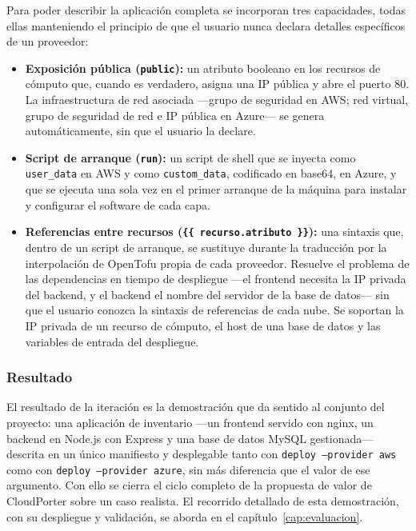 Para poder describir la aplicación completa se incorporan tres capacidades, todas ellas
manteniendo el principio de que el usuario nunca declara detalles específicos de un proveedor:

\begin{itemize}
    \item \textbf{Exposición pública (\texttt{public}):} un atributo booleano en los recursos de
    cómputo que, cuando es verdadero, asigna una IP pública y abre el puerto 80. La
    infraestructura de red asociada —grupo de seguridad en AWS; red virtual, grupo de seguridad
    de red e IP pública en Azure— se genera automáticamente, sin que el usuario la declare.
    \item \textbf{Script de arranque (\texttt{run}):} un script de shell que se inyecta como
    \texttt{user\_data} en AWS y como \texttt{custom\_data}, codificado en base64, en Azure, y
    que se ejecuta una sola vez en el primer arranque de la máquina para instalar y configurar el
    software de cada capa.
    \item \textbf{Referencias entre recursos (\texttt{\{\{ recurso.atributo \}\}}):} una sintaxis
    que, dentro de un script de arranque, se sustituye durante la traducción por la interpolación
    de OpenTofu propia de cada proveedor. Resuelve el problema de las dependencias en tiempo de
    despliegue —el frontend necesita la IP privada del backend, y el backend el nombre del
    servidor de la base de datos— sin que el usuario conozca la sintaxis de referencias de cada
    nube. Se soportan la IP privada de un recurso de cómputo, el host de una base de datos y las
    variables de entrada del despliegue.
\end{itemize}

\subsubsection{Resultado}

El resultado de la iteración es la demostración que da sentido al conjunto del proyecto: una
aplicación de inventario —un frontend servido con nginx, un backend en Node.js con Express y una
base de datos MySQL gestionada— descrita en un único manifiesto y desplegable tanto con
\texttt{deploy~--provider~aws} como con \texttt{deploy~--provider~azure}, sin más diferencia que
el valor de ese argumento. Con ello se cierra el ciclo completo de la propuesta de valor de
CloudPorter sobre un caso realista. El recorrido detallado de esta demostración, con su
despliegue y validación, se aborda en el capítulo~\ref{cap:evaluacion}.

